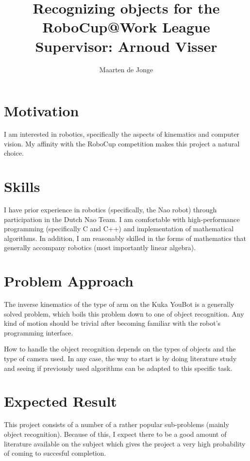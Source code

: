 \documentclass[a4paper, 10pt]{article}
\author{Maarten de Jonge}
\title{Recognizing objects for the RoboCup@Work League \\
       \Large{Supervisor: Arnoud Visser}}
\begin{document}
\maketitle

\section*{Motivation}
I am interested in robotics, specifically the aspects of kinematics and computer
vision. My affinity with the RoboCup competition makes this project a natural
choice.

\section*{Skills}
I have prior experience in robotics (specifically, the Nao robot) through
participation in the Dutch Nao Team. I am comfortable with high-performance
programming (specifically C and C++) and implementation of mathematical
algorithms. In addition, I am reasonably skilled in the forms of mathematics
that generally accompany robotics (most importantly linear algebra).

\section*{Problem Approach}
The inverse kinematics of the type of arm on the Kuka YouBot is a generally
solved problem, which boils this problem down to one of object recognition. Any
kind of motion should be trivial after becoming familiar with the robot's
programming interface. 

How to handle the object recognition depends on the types of objects and the
type of camera used. In any case, the way to start is by doing literature study
and seeing if previously used algorithms can be adapted to this specific task.

\section*{Expected Result}
This project consists of a number of a rather popular sub-problems (mainly
object recognition). Because of this, I expect there to be a good amount of
literature available on the subject which gives the project a very high
probability of coming to succesful completion.
	
\end{document}
